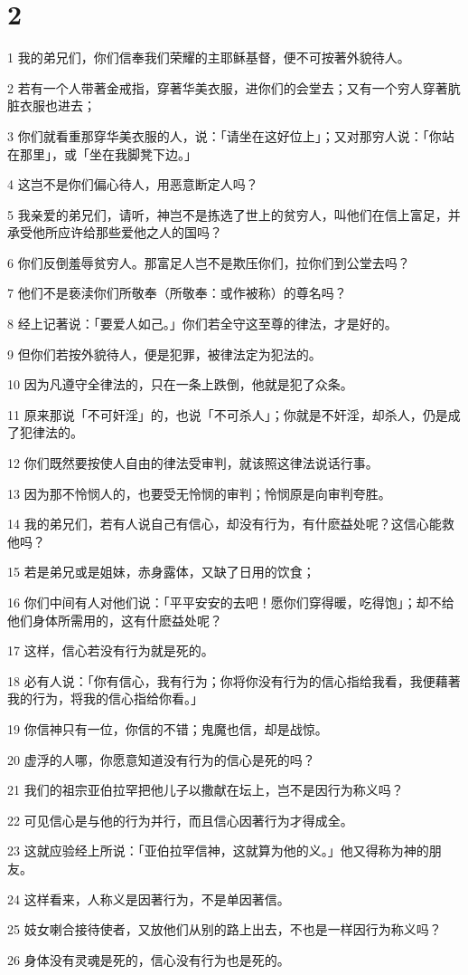 \chapter{2}

\par 1 我的弟兄们，你们信奉我们荣耀的主耶稣基督，便不可按著外貌待人。
\par 2 若有一个人带著金戒指，穿著华美衣服，进你们的会堂去；又有一个穷人穿著肮脏衣服也进去；
\par 3 你们就看重那穿华美衣服的人，说：「请坐在这好位上」；又对那穷人说：「你站在那里」，或「坐在我脚凳下边。」
\par 4 这岂不是你们偏心待人，用恶意断定人吗？
\par 5 我亲爱的弟兄们，请听，神岂不是拣选了世上的贫穷人，叫他们在信上富足，并承受他所应许给那些爱他之人的国吗？
\par 6 你们反倒羞辱贫穷人。那富足人岂不是欺压你们，拉你们到公堂去吗？
\par 7 他们不是亵渎你们所敬奉（所敬奉：或作被称）的尊名吗？
\par 8 经上记著说：「要爱人如己。」你们若全守这至尊的律法，才是好的。
\par 9 但你们若按外貌待人，便是犯罪，被律法定为犯法的。
\par 10 因为凡遵守全律法的，只在一条上跌倒，他就是犯了众条。
\par 11 原来那说「不可奸淫」的，也说「不可杀人」；你就是不奸淫，却杀人，仍是成了犯律法的。
\par 12 你们既然要按使人自由的律法受审判，就该照这律法说话行事。
\par 13 因为那不怜悯人的，也要受无怜悯的审判；怜悯原是向审判夸胜。
\par 14 我的弟兄们，若有人说自己有信心，却没有行为，有什麽益处呢？这信心能救他吗？
\par 15 若是弟兄或是姐妹，赤身露体，又缺了日用的饮食；
\par 16 你们中间有人对他们说：「平平安安的去吧！愿你们穿得暖，吃得饱」；却不给他们身体所需用的，这有什麽益处呢？
\par 17 这样，信心若没有行为就是死的。
\par 18 必有人说：「你有信心，我有行为；你将你没有行为的信心指给我看，我便藉著我的行为，将我的信心指给你看。」
\par 19 你信神只有一位，你信的不错；鬼魔也信，却是战惊。
\par 20 虚浮的人哪，你愿意知道没有行为的信心是死的吗？
\par 21 我们的祖宗亚伯拉罕把他儿子以撒献在坛上，岂不是因行为称义吗？
\par 22 可见信心是与他的行为并行，而且信心因著行为才得成全。
\par 23 这就应验经上所说：「亚伯拉罕信神，这就算为他的义。」他又得称为神的朋友。
\par 24 这样看来，人称义是因著行为，不是单因著信。
\par 25 妓女喇合接待使者，又放他们从别的路上出去，不也是一样因行为称义吗？
\par 26 身体没有灵魂是死的，信心没有行为也是死的。

